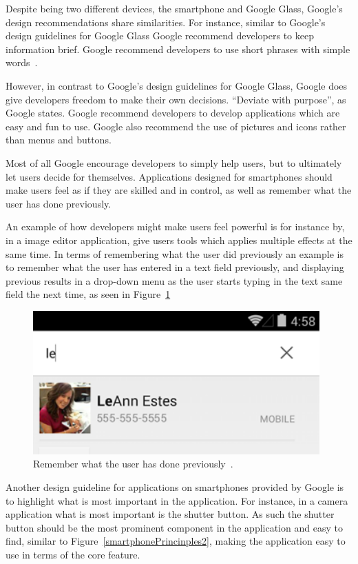 Despite being two different devices, the smartphone and Google Glass, Google's design recommendations share similarities. For instance, similar to Google's design guidelines for Google Glass Google recommend developers to keep information brief. Google recommend developers to use short phrases with simple words~\cite{androidDesignPrinciples}.

However, in contrast to Google's design guidelines for Google Glass, Google does give developers freedom to make their own decisions. ``Deviate with purpose'', as Google states. Google recommend developers to develop applications which are easy and fun to use. Google also recommend the use of pictures and icons rather than menus and buttons.

Most of all Google encourage developers to simply help users, but to ultimately let users decide for themselves. Applications designed for smartphones should make users feel as if they are skilled and in control, as well as remember what the user has done previously.

An example of how developers might make users feel powerful is for instance by, in a image editor application, give users tools which applies multiple effects at the same time. In terms of remembering what the user did previously an example is to remember what the user has entered in a text field previously, and displaying previous results in a drop-down menu as the user starts typing in the text same field the next time, as seen in Figure~\ref{smartphonePrinciples1}

	\begin{figure}[ht!]
		\centering
		\includegraphics[width=110mm]{images/principles_get_to_know_me}
		\caption{Remember what the user has done previously~\cite{androidDesignPrinciples}.}
		\label{smartphonePrinciples1}
	\end{figure}

Another design guideline for applications on smartphones provided by Google is to highlight what is most important in the application. For instance, in a camera application what is most important is the shutter button. As such the shutter button should be the most prominent component in the application and easy to find, similar to Figure~\ref{smartphonePrincinples2}, making the application easy to use in terms of the core feature.

